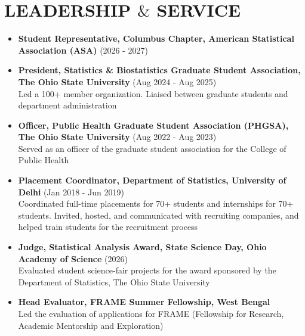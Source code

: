 \documentclass[11pt,a4paper,roman]{moderncv}        %
\begin{document}
\section{LEADERSHIP $\&$ SERVICE}
\begin{itemize}
\item \textbf{Student Representative, Columbus Chapter, American Statistical Association (ASA)} (2026 - 2027)
\item \textbf{President, Statistics \& Biostatistics Graduate Student Association, The Ohio State University} (Aug 2024 - Aug 2025)\\
Led a 100+ member organization. Liaised between graduate students and department administration
\item \textbf{Officer, Public Health Graduate Student Association (PHGSA), The Ohio State University} (Aug 2022 - Aug 2023)\\
Served as an officer of the graduate student association for the College of Public Health
\item \textbf{Placement Coordinator, Department of Statistics, University of Delhi} (Jan 2018 - Jun 2019)\\
Coordinated full-time placements for 70+ students and internships for 70+ students. Invited, hosted, and communicated with recruiting companies, and helped train students for the recruitment process
\vskip 0.1cm
\item \textbf{Judge, Statistical Analysis Award, State Science Day, Ohio Academy of Science} (2026)\\
Evaluated student science-fair projects for the award sponsored by the Department of Statistics, The Ohio State University
\vskip 0.1cm
\item \textbf{Head Evaluator, FRAME Summer Fellowship, West Bengal}\\
Led the evaluation of applications for FRAME (Fellowship for Research, Academic Mentorship and Exploration)
 \end{itemize}

\end{document}
